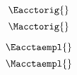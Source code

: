 

\begin{landscape}

\linespread{1}


\sectionsep{}

{
\begin{equation} \label{eq:E_acct_orig}
  \Eacctorig{}
\end{equation}
}
{
\begin{equation} \label{eq:M_acct_orig}
  \Macctorig{}
\end{equation}
}

\sectionsep{}

{
\begin{equation} \label{eq:E_acct_aemp}
  \Eacctaempl{}
\end{equation}
}
{
\begin{equation} \label{eq:M_acct_aemp}
  \Macctaempl{}
\end{equation}
}

\sectionsep{}

\derivsection{}
{
~
  
}
\end{landscape}
